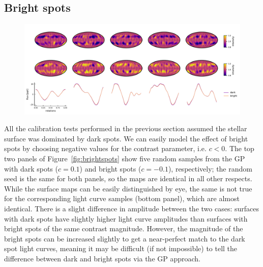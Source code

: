 \documentclass[modern]{aastex62}
\begin{document}
\subsection{Bright spots}
\label{sec:brightspots}

\begin{figure}[t!]
    \begin{centering}
        \includegraphics[width=\linewidth]{figures/brightspots.pdf}
    \end{centering}
\end{figure}

All the calibration tests performed in the previous section assumed the
stellar surface was dominated by dark spots. We can easily model the
effect of bright spots by choosing negative values for the contrast
parameter, i.e. $c < 0$. The top two panels of Figure~\ref{fig:brightspots}
show five random samples from the GP with dark spots ($c = 0.1$) and
bright spots ($c = -0.1$), respectively; the random seed is the same for
both panels, so the maps are identical in all other respects.
While the surface maps can be easily distinguished by eye, the same is not
true for the corresponding light curve samples (bottom panel), which
are almost identical. There is a slight difference in amplitude between
the two cases: surfaces with dark spots have slightly higher light curve
amplitudes than surfaces with bright spots of the same contrast magnitude.
However, the magnitude of the bright spots can be increased slightly to get
a near-perfect match to the dark spot light curves, meaning it may be
difficult (if not impossible) to tell the difference between dark and bright
spots via the GP approach.
\end{document}
